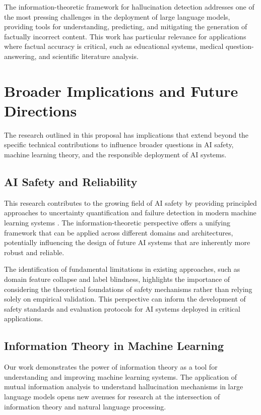 \documentclass[11pt, oneside]{book}
\theoremstyle{plain}
\theoremstyle{definition}
\theoremstyle{remark}
\begin{document}
The information-theoretic framework for hallucination detection addresses one of the most pressing challenges in the deployment of large language models, providing tools for understanding, predicting, and mitigating the generation of factually incorrect content. This work has particular relevance for applications where factual accuracy is critical, such as educational systems, medical question-answering, and scientific literature analysis.

\section{Broader Implications and Future Directions}

The research outlined in this proposal has implications that extend beyond the specific technical contributions to influence broader questions in AI safety, machine learning theory, and the responsible deployment of AI systems.

\subsection{AI Safety and Reliability}

This research contributes to the growing field of AI safety by providing principled approaches to uncertainty quantification and failure detection in modern machine learning systems \citep{lakshminarayanan2017simple}. The information-theoretic perspective offers a unifying framework that can be applied across different domains and architectures, potentially influencing the design of future AI systems that are inherently more robust and reliable.

The identification of fundamental limitations in existing approaches, such as domain feature collapse and label blindness, highlights the importance of considering the theoretical foundations of safety mechanisms rather than relying solely on empirical validation. This perspective can inform the development of safety standards and evaluation protocols for AI systems deployed in critical applications.

\subsection{Information Theory in Machine Learning}

Our work demonstrates the power of information theory as a tool for understanding and improving machine learning systems. The application of mutual information analysis to understand hallucination mechanisms in large language models opens new avenues for research at the intersection of information theory and natural language processing.
\end{document}
